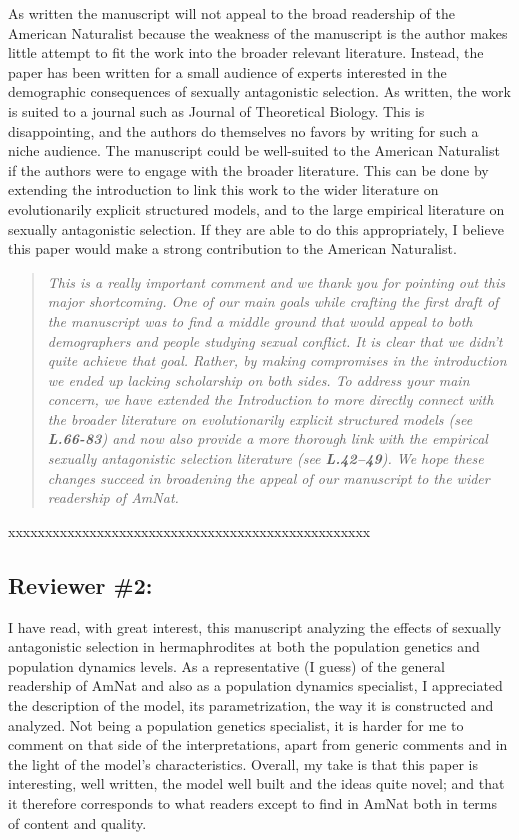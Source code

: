 \documentclass[11pt]{article}
\begin{document}
As written the manuscript will not appeal to the broad readership of the American Naturalist because the weakness of the manuscript is the author makes little attempt to fit the work into the broader relevant literature. Instead, the paper has been written for a small audience of experts interested in the demographic consequences of sexually antagonistic selection. As written, the work is suited to a journal such as Journal of Theoretical Biology. This is disappointing, and the authors do themselves no favors by writing for such a niche audience. The manuscript could be well-suited to the American Naturalist if the authors were to engage with the broader literature. This can be done by extending the introduction to link this work to the wider literature on evolutionarily explicit structured models, and to the large empirical literature on sexually antagonistic selection. If they are able to do this appropriately, I believe this paper would make a strong contribution to the American Naturalist.

\begin{quote}
	{\itshape This is a really important comment and we thank you for pointing out this major shortcoming. One of our main goals while crafting the first draft of the manuscript was to find a middle ground that would appeal to both demographers and people studying sexual conflict. It is clear that we didn't quite achieve that goal. Rather, by making compromises in the introduction we ended up lacking scholarship on both sides. To address your main concern, we have extended the Introduction to more directly connect with the broader literature on evolutionarily explicit structured models (see {\bf L.66-83}) and now also provide a more thorough link with the empirical sexually antagonistic selection literature (see {\bf L.42--49}). We hope these changes succeed in broadening the appeal of our manuscript to the wider readership of AmNat.}
\end{quote}

\noindent xxxxxxxxxxxxxxxxxxxxxxxxxxxxxxxxxxxxxxxxxxxxxxxxx


\subsection*{Reviewer \#2:}

I have read, with great interest, this manuscript analyzing the effects of sexually antagonistic selection in hermaphrodites at both the population genetics and population dynamics levels. As a representative (I guess) of the general readership of AmNat and also as a population dynamics specialist, I appreciated the description of the model, its parametrization, the way it is constructed and analyzed. Not being a population genetics specialist, it is harder for me to comment on that side of the interpretations, apart from generic comments and in the light of the model’s characteristics. Overall, my take is that this paper is interesting, well written, the model well built and the ideas quite novel; and that it therefore corresponds to what readers except to find in AmNat both in terms of content and quality.
\end{document}
